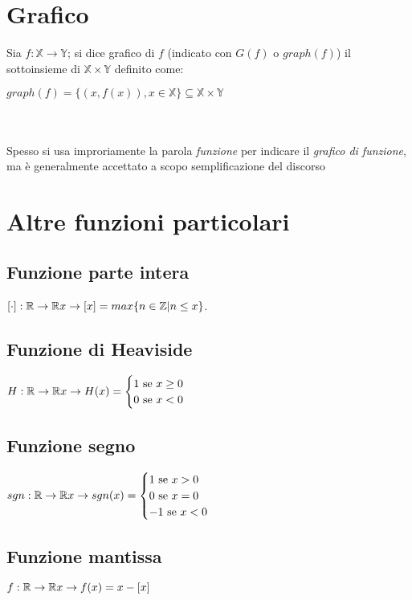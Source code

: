 \section{Grafico}
Sia $f: \mathbb{X} \rightarrow \mathbb{Y}$; si dice grafico di $f$ (indicato con $G(f)$ o $graph(f)$) il sottoinsieme di $\mathbb{X}\times\mathbb{Y}$ definito come:\\
\begin{Large}
$graph(f)=\{(x,f(x)), x \in \mathbb{X}\} \subseteq \mathbb{X}\times\mathbb{Y}$
\end{Large}\\
\\
Spesso si usa improriamente la parola \textit{funzione} per indicare il \textit{grafico di funzione}, ma è generalmente accettato a scopo semplificazione del discorso

\section{Altre funzioni particolari}
\subsection{Funzione parte intera}
$[\cdot]: \mathbb{R} \rightarrow \mathbb{R}\\
x \rightarrow [x] = max\{n \in \mathbb{Z} | n\leq x\}$.
\subsection{Funzione di Heaviside}
$H: \mathbb{R} \rightarrow \mathbb{R}\\
x \rightarrow H(x) =
\begin{cases}
1 \text{  se } x \geq 0\\
0 \text{  se } x < 0
\end{cases}$
\subsection{Funzione segno}
$sgn: \mathbb{R} \rightarrow \mathbb{R}\\
x \rightarrow sgn(x) =
\begin{cases}
1 \text{  se } x > 0\\
0 \text{  se } x = 0\\
-1 \text{  se } x < 0
\end{cases}$
\subsection{Funzione mantissa}
$f: \mathbb{R} \rightarrow \mathbb{R}\\
x \rightarrow f(x) = x - [x]$
